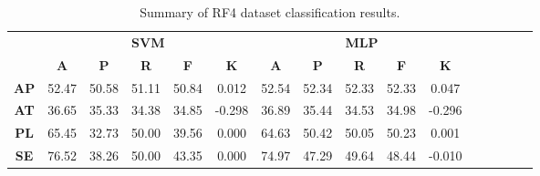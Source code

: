 \begin{landscape}
\begin{table}[htbp]
\footnotesize
\centering
\caption{Summary of RF4 dataset classification results.}
\label{tab:base_female}
\begin{tabular}{|c|c|c|c|c|c|c|c|c|c|c|c|c|c|c|c|}
\hline
\multirow{2}{*}{}	& \multicolumn{5}{c|}{\textbf{SVM}}												& \multicolumn{5}{c|}{\textbf{MLP}}												\\ \cline{2-11} 
					& \textbf{A}	& \textbf{P}	& \textbf{R}	& \textbf{F}	& \textbf{K}	& \textbf{A}	& \textbf{P}	& \textbf{R}	& \textbf{F}	& \textbf{K}	\\ \hline
\textbf{AP}			& 52.47			& 50.58			& 51.11			& 50.84			& 0.012			& 52.54			& 52.34			& 52.33			& 52.33			& 0.047			\\ \hline
\textbf{AT}			& 36.65			& 35.33			& 34.38			& 34.85			& -0.298			& 36.89			& 35.44			& 34.53			& 34.98			& -0.296			\\ \hline
\textbf{PL}			& 65.45			& 32.73			& 50.00			& 39.56			& 0.000			& 64.63			& 50.42			& 50.05			& 50.23			& 0.001			\\ \hline
\textbf{SE}			& 76.52			& 38.26			& 50.00			& 43.35			& 0.000			& 74.97			& 47.29			& 49.64			& 48.44			& -0.010			\\ \hline
\end{tabular}
\end{table}
\end{landscape}